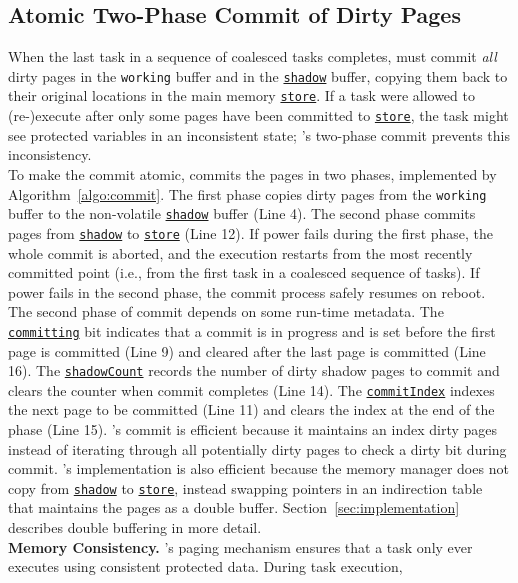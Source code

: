 \subsection{Atomic Two-Phase Commit of Dirty Pages}
%
When the last task in a sequence of coalesced tasks completes, \sys must commit
\emph{all} dirty pages in the \texttt{working} buffer and in the
\texttt{\underline{shadow}} buffer, copying them back to their original
locations in the main memory \texttt{\underline{store}}. If a task were allowed
to (re-)execute after only some pages have been committed to
\texttt{\underline{store}}, the task might see protected variables in an
inconsistent state; \sys's two-phase commit prevents this inconsistency. \\
%
To make the commit atomic, \sys commits the pages in two phases, implemented by
Algorithm~\ref{algo:commit}.
%
The first phase copies dirty pages from the \texttt{working} buffer to the
non-volatile \texttt{\underline{shadow}} buffer (Line 4). The second phase
commits pages from \texttt{\underline{shadow}} to \texttt{\underline{store}}
(Line 12).  If power fails during the first phase, the whole commit is aborted,
and the execution restarts from the most recently committed point (i.e., from
the first task in a coalesced sequence of tasks). If power fails in the second
phase, the commit process safely resumes on reboot.  The second phase of commit
depends on some run-time metadata. The \texttt{\underline{committing}} bit
indicates that a commit is in progress and is set before the first page is
committed (Line 9) and cleared after the last page is committed (Line 16).  The
\texttt{\underline{shadowCount}} records the number of dirty shadow pages to
commit and \sys clears the counter when commit completes (Line 14).  The
\texttt{\underline{commitIndex}} indexes the next page to be committed (Line
11) and \sys clears the index at the end of the phase (Line 15).
%
\sys's commit is efficient because it maintains an index dirty pages instead of
iterating through all potentially dirty pages to check a dirty bit during
commit.
%
\sys's implementation is also efficient because the memory manager does not
copy from \texttt{\underline{shadow}} to \texttt{\underline{store}}, instead
swapping pointers in an indirection table that maintains the pages as a double
buffer.  Section~\ref{sec:implementation} describes double buffering in more
detail. \\
%
\textbf{Memory Consistency.} \sys's paging mechanism ensures that a task only
ever executes using consistent protected data. During task execution,
